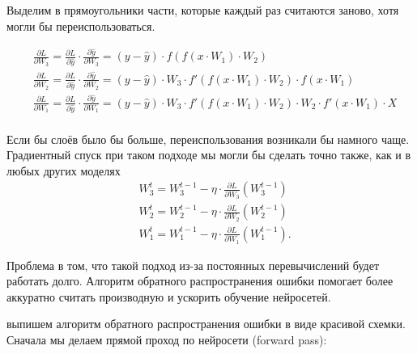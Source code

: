 \begin{sol}
Выделим в прямоугольники части, которые каждый раз считаются заново, хотя могли бы переиспользоваться. 


\begin{equation*}
    \begin{aligned} 
    & \frac{\partial L}{\partial W_3} =  \frac{\partial L}{\partial \hat y} \cdot \frac{\partial \hat y}{\partial W_3} = \boxed{ (y - \hat{y}) } \cdot f(f(x\cdot W_1) \cdot W_2) \\
    & \frac{\partial L}{\partial W_2} =  \frac{\partial L}{\partial \hat y} \cdot \frac{\partial \hat y}{\partial W_2} = \boxed{ (y - \hat{y})} \cdot \boxed{ W_3 \cdot f'(f(x\cdot W_1) \cdot W_2)} \cdot f(x\cdot W_1) \\
    & \frac{\partial L}{\partial W_1} = \frac{\partial L}{\partial \hat y} \cdot \frac{\partial \hat y}{\partial W_1} = \boxed{ (y - \hat{y}) } \cdot \boxed{ W_3 \cdot f'(f(x\cdot W_1) \cdot W_2)} \cdot W_2 \cdot  f'(x\cdot W_1) \cdot X \\
    \end{aligned} 
\end{equation*}

Если бы слоёв было бы больше, переиспользования возникали бы намного чаще. Градиентный спуск при таком подходе мы могли бы сделать точно также, как и в любых других моделях \begin{equation*}
    \begin{aligned} 
    & W_3^t = W_3^{t-1} - \eta \cdot \frac{\partial L}{\partial W_3}( W_3^{t-1}) \\
    & W_2^t = W_2^{t-1} - \eta \cdot\frac{\partial L}{\partial W_2} ( W_2^{t-1}) \\
    & W_1^t = W_1^{t-1} - \eta \cdot\frac{\partial L}{\partial W_1} ( W_1^{t-1}).
    \end{aligned} 
\end{equation*}

Проблема в том, что такой подход из-за постоянных перевычислений будет работать долго. Алгоритм обратного распространения ошибки помогает более аккуратно считать производную и ускорить обучение нейросетей. 

 выпишем алгоритм обратного распространения ошибки в виде красивой схемки. Сначала мы делаем прямой проход по нейросети (forward pass): 

\begin{center}
\end{center}
\end{sol}
